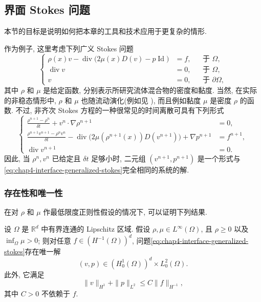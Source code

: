\subsection{界面 Stokes 问题}
\label{sec:chap4-interface-stokes}

\renewcommand{\thestatement}{8.\arabic{statement}}
\renewcommand{\theHstatement}{ch04.sec08.\arabic{statement}}
\setcounter{statement}{0}

本节的目标是说明如何把本章的工具和技术应用于更复杂的情形.

作为例子, 这里考虑下列广义 Stokes 问题
\begin{equation}
 \left\{
 \begin{aligned}
  \rho(x)v-\operatorname{div}\bigl(2\mu(x)D(v)-p\operatorname{Id}\bigr)&=f,&&\text{于 }\Omega,\\
  \operatorname{div}v&=0,&&\text{于 }\Omega,\\
  v&=0,&&\text{于 }\partial\Omega,
 \end{aligned}
 \right.
 \label{eq:chap4-interface-generalized-stokes}
\end{equation}
其中 $\rho$ 和 $\mu$ 是给定函数, 分别表示所研究流体混合物的密度和黏度. 当然, 在实际的非稳态情形中, $\rho$ 和 $\mu$ 也随流动演化(例如见 ), 而且例如黏度 $\mu$ 是密度 $\rho$ 的函数. 不过, 非齐次 Stokes 方程的一种很常见的时间离散可具有下列形式
\[
 \left\{
 \begin{aligned}
  \frac{\rho^{n+1}-\rho^n}{\delta t}+v^n\cdot\nabla\rho^{n+1}&=0,\\
  \frac{\rho^{n+1}v^{n+1}-\rho^nv^n}{\delta t}
  -\operatorname{div}\bigl(2\mu(\rho^{n+1}(x))D(v^{n+1})\bigr)
  +\nabla p^{n+1}&=f^{n+1},\\
  \operatorname{div}v^{n+1}&=0.
 \end{aligned}
 \right.
\]
因此, 当 $\rho^n,v^n$ 已给定且 $\delta t$ 足够小时, 二元组 $(v^{n+1},p^{n+1})$ 是一个形式与\eqref{eq:chap4-interface-generalized-stokes}完全相同的系统的解.

\subsubsection{存在性和唯一性}
\label{subsec:chap4-interface-existence-uniqueness}

在对 $\rho$ 和 $\mu$ 作最低限度正则性假设的情况下, 可以证明下列结果.

\begin{Theorem}
\label{thm:chap4-interface-wellposedness}
设 $\Omega$ 是 $\mathbb R^d$ 中有界连通的 Lipschitz 区域. 假设 $\rho,\mu\in L^\infty(\Omega)$, 且 $\rho\geq0$ 以及 $\inf_\Omega\mu>0$; 则对任意 $f\in(H^{-1}(\Omega))^d$, 问题\eqref{eq:chap4-interface-generalized-stokes}存在唯一解
\[
 (v,p)\in(H_0^1(\Omega))^d\times L_0^2(\Omega).
\]
此外, 它满足
\[
 \|v\|_{H^1}+\|p\|_{L^2}\leq C\|f\|_{H^{-1}},
\]
其中 $C>0$ 不依赖于 $f$.
\end{Theorem}

